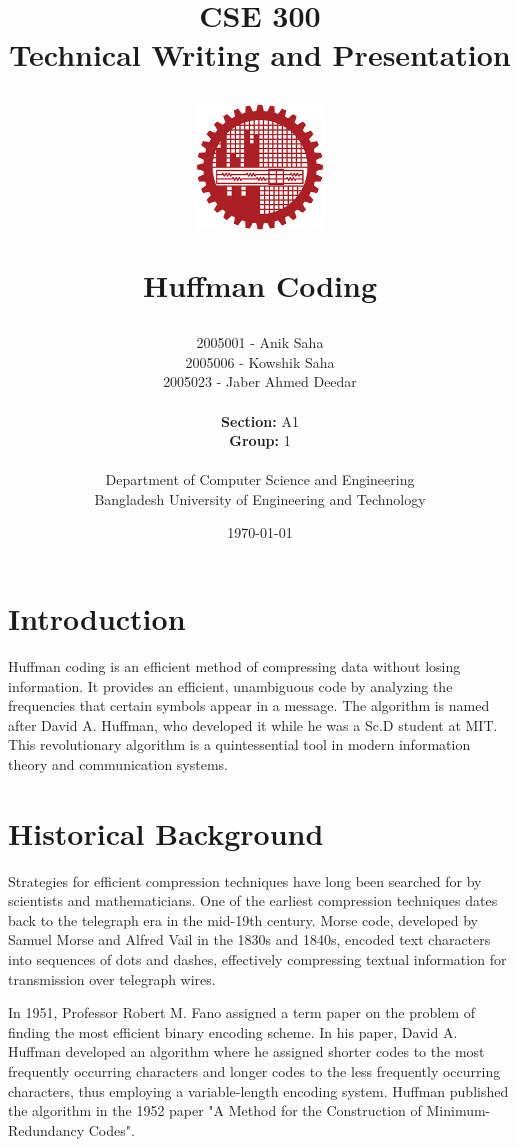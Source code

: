 \documentclass[18pt]{article}
\title{CSE 300 \\
	Technical Writing and Presentation \\
	
	\vspace{5mm}
	
	\begin{figure}[h]
		\centering
		\includegraphics[width=0.3\textwidth]{images/buet.png}
		\label{fig:enter-label}
	\end{figure}
	
	\textbf{Huffman Coding}}
\author{
	2005001 - Anik Saha\\
	2005006 - Kowshik Saha\\
	2005023 - Jaber Ahmed Deedar \\ \\
	\textbf{Section:} A1\\
	\textbf{Group:} 1\\ \\
	Department of Computer Science and Engineering\\
	Bangladesh University of Engineering and Technology\\
}
\date{\today}
\begin{document}
	\maketitle
	\pagebreak
	
	\setlength{\parskip}{0.5em}
	
	\tableofcontents
	
	\setlength{\parskip}{1em}
	\newpage
	
	\listoffigures
	\newpage
	
	\listoftables
	\newpage
	
	\newpage
	
	\section{Introduction}	
	
	Huffman coding is an efficient method of compressing data without
	losing information. It provides an efficient, unambiguous code by
	analyzing the frequencies that certain symbols appear in a message.
	The algorithm is named after David A. Huffman, who developed it
	while he was a Sc.D student at MIT. This revolutionary algorithm is a quintessential tool in modern information theory and communication systems.
	
	\section{Historical Background}
	
	Strategies for efficient compression techniques have long been searched for by scientists and mathematicians. One of the earliest compression techniques dates back to the telegraph era in the mid-19th century. Morse code, developed by Samuel Morse and Alfred Vail in the 1830s and 1840s, encoded text characters into sequences of dots and dashes, effectively compressing textual information for transmission over telegraph wires\cite{burns2004communications}. 
	
	In 1951, Professor Robert M. Fano assigned a term paper on the problem of
	finding the most efficient binary encoding scheme. In his paper, David A. Huffman
	developed an algorithm where he assigned shorter codes to the most
	frequently occurring characters and longer codes to the less frequently
	occurring characters, thus employing a variable-length encoding system. Huffman published the algorithm in the 1952 paper "A Method for the Construction of Minimum-Redundancy Codes".\cite{huffman1952}
	
\end{document}
